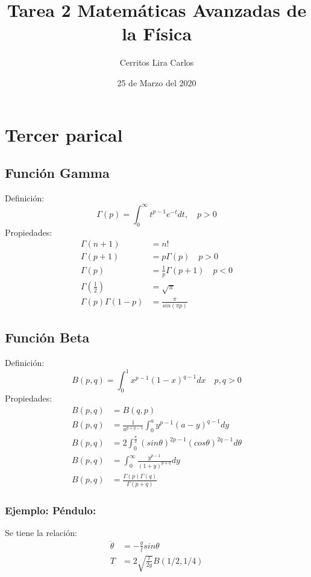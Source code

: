 \documentclass{article}
\title{Tarea 2 Matemáticas Avanzadas de la Física}
\author{Cerritos Lira Carlos}
\date{25 de Marzo del 2020}
\begin{document}
\maketitle
\section*{Tercer parical}
\subsection*{Función Gamma}
Definición:
\[ \Gamma(p) = \int_0^\infty t^{p-1}e^{-t}dt, \quad p>0 \]
Propiedades:
\begin{align*}
    \Gamma(n+1) &= n! \\
    \Gamma(p+1) &= p\Gamma(p) \quad p>0 \\
    \Gamma(p) &= \frac{1}{p} \Gamma(p+1) \quad p <0 \\
    \Gamma(\tfrac{1}{2}) &= \sqrt{\pi} \\
    \Gamma(p)\Gamma(1-p) &= \frac{\pi}{sin(\pi p)}
\end{align*}
\subsection*{Función Beta}
Definición:
\[ B(p,q) = \int_{0}^1 x^{p-1}(1-x)^{q-1}dx \quad p,q > 0 \]
Propiedades:
\begin{align*}
    B(p,q) &= B(q,p) \\
    B(p,q) &= \frac{1}{a^{p+q-1}}\int_0^a y^{p-1}(a-y)^{q-1}dy \\
    B(p,q) &= 2\int_{0}^\frac{\pi}{2} (sin\theta)^{2p-1}(cos\theta)^{2q-1} d\theta \\
    B(p,q) &= \int_{0}^\infty \frac{y^{p-1}}{(1+y)^{p+q}}dy\\
    B(p,q) &= \frac{\Gamma(p)\Gamma(q)}{\Gamma(p+q)} 
\end{align*}
\begin{tcolorbox}
    \subsubsection*{Ejemplo: Péndulo:}
    Se tiene la relación:
    \begin{align*}
        \ddot{\theta} &= -\frac{g}{l}sin\theta \\
        T &= 2 \sqrt{\frac{l}{2g}}B(1/2,1/4)
    \end{align*}
\end{tcolorbox}
\end{document}
